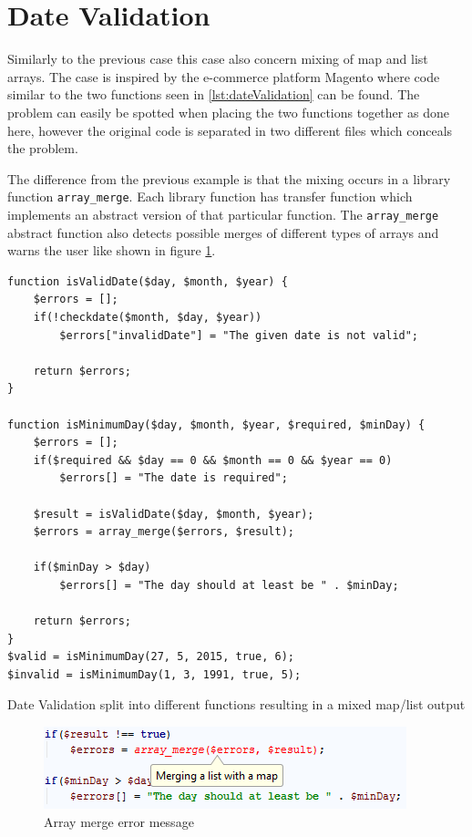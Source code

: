 \section{Date Validation}
Similarly to the previous case this case also concern mixing of map and list arrays. The case is inspired by the e-commerce platform Magento where code similar to the two functions seen in \ref{lst:dateValidation} can be found. The problem can easily be spotted when placing the two functions together as done here, however the original code is separated in two different files which conceals the problem.

The difference from the previous example is that the mixing occurs in a library function \texttt{array\_merge}. Each library function has transfer function which implements an abstract version of that particular function. The \texttt{array\_merge} abstract function also detects possible merges of different types of arrays and warns the user like shown in figure \ref{fig:dateScreenshot}.

\begin{program}
\begin{lstlisting}
function isValidDate($day, $month, $year) {
    $errors = [];
    if(!checkdate($month, $day, $year))
        $errors["invalidDate"] = "The given date is not valid";

    return $errors;
}

function isMinimumDay($day, $month, $year, $required, $minDay) {
    $errors = [];
    if($required && $day == 0 && $month == 0 && $year == 0)
        $errors[] = "The date is required";

    $result = isValidDate($day, $month, $year);
    $errors = array_merge($errors, $result);

    if($minDay > $day)
        $errors[] = "The day should at least be " . $minDay;

    return $errors;
}
$valid = isMinimumDay(27, 5, 2015, true, 6);
$invalid = isMinimumDay(1, 3, 1991, true, 5);
\end{lstlisting}
\caption{Date Validation split into different functions resulting in a mixed map/list output}
\label{lst:dateValidation}
\end{program}

\begin{figure}
\centering
\includegraphics[scale=0.6]{chapters/caseStudy/dateError}
\caption{Array merge error message}
\label{fig:dateScreenshot}
\end{figure}